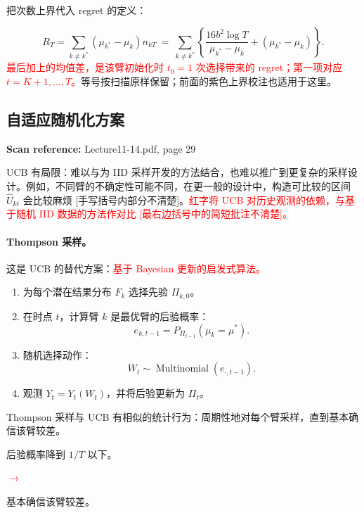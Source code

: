 \documentclass[11pt,a4paper]{article}
\newcommand{\sourcepages}[1]{\par{\small\sffamily\color{muted}\textbf{Scan reference:} #1\par}\nobreak\smallskip\nopagebreak[4]}
\newcommand{\inkred}[1]{\textcolor{red}{#1}}
\newcommand{\notearrow}[3]{%
\par\Needspace{6\baselineskip}\smallskip
\noindent\begin{minipage}[c]{0.43\linewidth}\raggedright\color{#1}#2\end{minipage}%
\hfill\textcolor{#1}{\(\longrightarrow\)}\hfill%
\begin{minipage}[c]{0.43\linewidth}\raggedright#3\end{minipage}\par\smallskip}
\begin{document}
把次数上界代入 regret 的定义：
\begin{center}
\end{center}
\[
 R_T=\sum_{k\ne k^*}(\mu_{k^*}-\mu_k)n_{kT}
 \ =\ \sum_{k\ne k^*}\left\{
 \frac{16b^2\log T}{\mu_{k^*}-\mu_k}+(\mu_{k^*}-\mu_k)\right\}.
\]
\inkred{最后加上的均值差，是该臂初始化时 $t_0=1$ 次选择带来的 regret；第一项对应 $t=K+1,\ldots,T$。}等号按扫描原样保留；前面的紫色上界校注也适用于这里。

\subsection{自适应随机化方案}
\sourcepages{Lecture11-14.pdf, page 29}
UCB 有局限：难以与为 IID 采样开发的方法结合，也难以推广到更复杂的采样设计。例如，不同臂的不确定性可能不同，在更一般的设计中，构造可比较的区间 $\widehat U_{kt}$ 会比较麻烦 [手写括号内部分不清楚]。\inkred{红字将 UCB 对历史观测的依赖，与基于随机 IID 数据的方法作对比 [最右边括号中的简短批注不清楚]。}

\paragraph{Thompson 采样。}
这是 UCB 的替代方案：\inkred{基于 Bayesian 更新的启发式算法。}
\begin{enumerate}
 \item 为每个潜在结果分布 $F_k$ 选择先验 $\Pi_{k,0}$。
 \item 在时点 $t$，计算臂 $k$ 是最优臂的后验概率：
 \[e_{k,t-1}=P_{\Pi_{t-1}}(\mu_k=\mu^*).\]
 \item 随机选择动作：
 \[W_t\sim\operatorname{Multinomial}(e_{\cdot,t-1}).\]
 \item 观测 $Y_t=Y_t(W_t)$，并将后验更新为 $\Pi_t$。
\end{enumerate}
Thompson 采样与 UCB 有相似的统计行为：周期性地对每个臂采样，直到基本确信该臂较差。\notearrow{red}{后验概率降到 $1/T$ 以下。}{基本确信该臂较差。}
\end{document}
